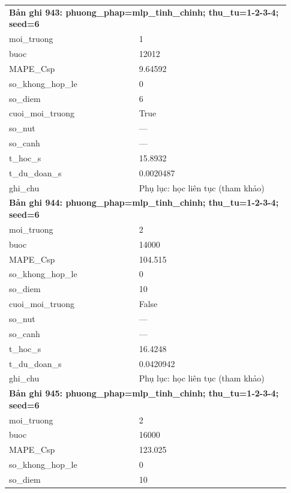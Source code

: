 \begin{longtable}{p{0.43\linewidth}p{0.50\linewidth}}
\midrule
\multicolumn{2}{p{0.95\linewidth}}{\textbf{Bản ghi 943: phuong\_phap=mlp\_tinh\_chinh; thu\_tu=1-2-3-4; seed=6}} \\
moi\_\allowbreak truong & 1 \\
buoc & 12012 \\
MAPE\_\allowbreak Csp & 9.64592 \\
so\_\allowbreak khong\_\allowbreak hop\_\allowbreak le & 0 \\
so\_\allowbreak diem & 6 \\
cuoi\_\allowbreak moi\_\allowbreak truong & True \\
so\_\allowbreak nut & — \\
so\_\allowbreak canh & — \\
t\_\allowbreak hoc\_\allowbreak s & 15.8932 \\
t\_\allowbreak du\_\allowbreak doan\_\allowbreak s & 0.0020487 \\
ghi\_\allowbreak chu & Phụ lục: học liên tục (tham khảo) \\
\midrule
\multicolumn{2}{p{0.95\linewidth}}{\textbf{Bản ghi 944: phuong\_phap=mlp\_tinh\_chinh; thu\_tu=1-2-3-4; seed=6}} \\
moi\_\allowbreak truong & 2 \\
buoc & 14000 \\
MAPE\_\allowbreak Csp & 104.515 \\
so\_\allowbreak khong\_\allowbreak hop\_\allowbreak le & 0 \\
so\_\allowbreak diem & 10 \\
cuoi\_\allowbreak moi\_\allowbreak truong & False \\
so\_\allowbreak nut & — \\
so\_\allowbreak canh & — \\
t\_\allowbreak hoc\_\allowbreak s & 16.4248 \\
t\_\allowbreak du\_\allowbreak doan\_\allowbreak s & 0.0420942 \\
ghi\_\allowbreak chu & Phụ lục: học liên tục (tham khảo) \\
\midrule
\multicolumn{2}{p{0.95\linewidth}}{\textbf{Bản ghi 945: phuong\_phap=mlp\_tinh\_chinh; thu\_tu=1-2-3-4; seed=6}} \\
moi\_\allowbreak truong & 2 \\
buoc & 16000 \\
MAPE\_\allowbreak Csp & 123.025 \\
so\_\allowbreak khong\_\allowbreak hop\_\allowbreak le & 0 \\
so\_\allowbreak diem & 10 \\

\end{longtable}
